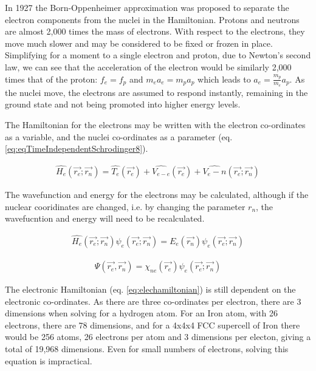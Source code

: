 In 1927 the Born-Oppenheimer approximation was proposed to separate the electron components from the nuclei in the Hamiltonian.  Protons and neutrons are almost 2,000 times the mass of electrons.  With respect to the electrons, they move much slower and may be considered to be fixed or frozen in place.  Simplifying for a moment to a single electron and proton, due to Newton's second law, we can see that the acceleration of the electron would be similarly 2,000 times that of the proton: $f_e = f_p$ and $m_e a_e = m_p a_p$ which leads to $a_e = \frac{m_p}{m_e} a_p$.  As the nuclei move, the electrons are assumed to respond instantly, remaining in the ground state and not being promoted into higher energy levels.

The Hamiltonian for the electrons may be written with the electron co-ordinates as a variable, and the nuclei co-ordinates as a parameter (eq. \ref{eq:eqTimeIndependentSchrodinger8}).

\begin{equation}
\begin{split}
\hat{H_e} (\vec{r_e}; \vec{r_n}) = \hat{T_e}(\vec{r_e}) + \hat{V_{e-e}}(\vec{r_e}) + \hat{V_e-n}(\vec{r_e}; \vec{r_n})
\end{split}
\label{eq:eqTimeIndependentSchrodinger8}
\end{equation}

The wavefunction and energy for the electrons may be calculated, although if the nuclear cooridinates are changed, i.e. by changing the parameter $r_n$, the wavefucntion and energy will need to be recalculated.

\begin{equation}
\begin{split}
\hat{H_e} (\vec{r_e}; \vec{r_n}) \psi_{e} (\vec{r_e}; \vec{r_n}) = E_e (\vec{r_n})  \psi_{e} (\vec{r_e}; \vec{r_n}) 
\end{split}
\label{eq:elechamiltonian}
\end{equation}


\begin{equation}
\begin{split}
\Psi (\vec{r_e}, \vec{r_n}) = \chi_{ne} (\vec{r_e}) \psi_{e} (\vec{r_e}; \vec{r_n})
\end{split}
\label{eq:combinedwavefunction}
\end{equation}

The electronic Hamiltonian (eq. \ref{eq:elechamiltonian}) is still dependent on the electronic co-ordinates.  As there are three co-ordinates per electron, there are 3 dimensions when solving for a hydrogen atom.  For an Iron atom, with 26 electrons, there are 78 dimensions, and for a 4x4x4 FCC supercell of Iron there would be 256 atoms, 26 electrons per atom and 3 dimensions per electon, giving a total of 19,968 dimensions.  Even for small numbers of electrons, solving this equation is impractical.




